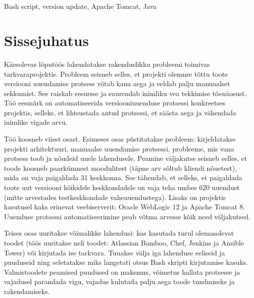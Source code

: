 \documentclass[12pt]{report}
\renewcommand{\headrulewidth}{0pt}
\begin{document}
  \\
  \vspace{2cm}

  \\
  Bash script, version update, Apache Tomcat, Java
  
  \newpage
 
  \tableofcontents
  \fancypagestyle{plain}{%
    \renewcommand{\headrulewidth}{0pt}%
    \fancyhf{}%
    \fancyfoot[R]{\thepage}%
}
 
  \newpage
  
  \section*{Sissejuhatus}
  \label{sissejuhatus}
  
  Käesolevas lõputöös lahendatakse rakenduslikku probleemi toimivas tarkvaraprojektis. Probleem seisneb selles, et projekti olemuse tõttu toote versiooni uuendamise protsess võtab kaua aega ja eeldab palju manuaalset sekkumist. See raiskab resursse ja suurendab inimliku vea tekkimise tõenäosust. Töö eesmärk on automatiseerida versiooniuuenduse protsessi konkreetses projektis, selleks, et lihtsustada antud protsessi, et säästa aega ja vähendada inimlike vigade arvu.
  
  Töö koosneb viiest osast. Esimeses osas püstitatakse probleem: kirjeldatakse projekti arhitektuuri, manuaalse uuendamise protsessi, probleeme, mis vana protsess toob ja nõudeid uuele lahendusele. Peamine väljakutse seisneb selles, et toode koosneb paarkümnest moodulitest (täpne arv sõltub kliendi nõuetest), mida on vaja paigaldada 31 keskkonna. See tähendab, et selleks, et paigaldada toote uut versiooni kõikidele keskkondadele on vaja teha umbes 620 uuendust (mitte arvestades testkeskkondade vaheuuendustega). Lisaks on projektis kasutusel kaks erinevat veebiserverit: Oracle WebLogic 12 ja Apache Tomcat 8. Uuenduse protsessi automatiseerimine peab võtma arvesse kõik need väljakutsed.
  
  Teises osas uuritakse võimalikke lahendusi: kas kasutada turul olemasolevat toodet (töös uuritakse neli toodet: Atlassian Bamboo, Chef, Jenkins ja Ansible Tower) või kirjutada ise tarkvara. Tuuakse välja iga lahenduse eeliseid ja puuduseid ning seletatakse miks langetati otsus Bash skripti kirjutamise kasuks. Valmistoodete peamised puudused on maksmus, võimetus hallata protsesse ja vajadusel parandada vigu, vajadus kulutada palju aega toode tundmiseks ja rakendamiseks.
  
\end{document}
